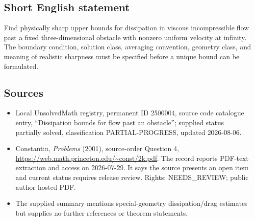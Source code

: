 \documentclass[11pt]{article}
\begin{document}
\subsection{Short English statement}
Find physically sharp upper bounds for dissipation in viscous incompressible flow past a fixed three-dimensional obstacle with nonzero uniform velocity at infinity. The boundary condition, solution class, averaging convention, geometry class, and meaning of realistic sharpness must be specified before a unique bound can be formulated.
\subsection{Sources}
\begin{itemize}
\item Local UnsolvedMath registry, permanent ID 2500004, source code catalogue entry, ``Dissipation bounds for flow past an obstacle''; supplied status partially solved, classification PARTIAL-PROGRESS, updated 2026-08-06.
\item Constantin, \emph{Problems} (2001), source-order Question 4, \url{https://web.math.princeton.edu/~const/2k.pdf}. The record reports PDF-text extraction and access on 2026-07-29. It says the source presents an open item and current status requires release review. Rights: NEEDS\_REVIEW; public author-hosted PDF.
\item The supplied summary mentions special-geometry dissipation/drag estimates but supplies no further references or theorem statements.
\end{itemize}
\end{document}
